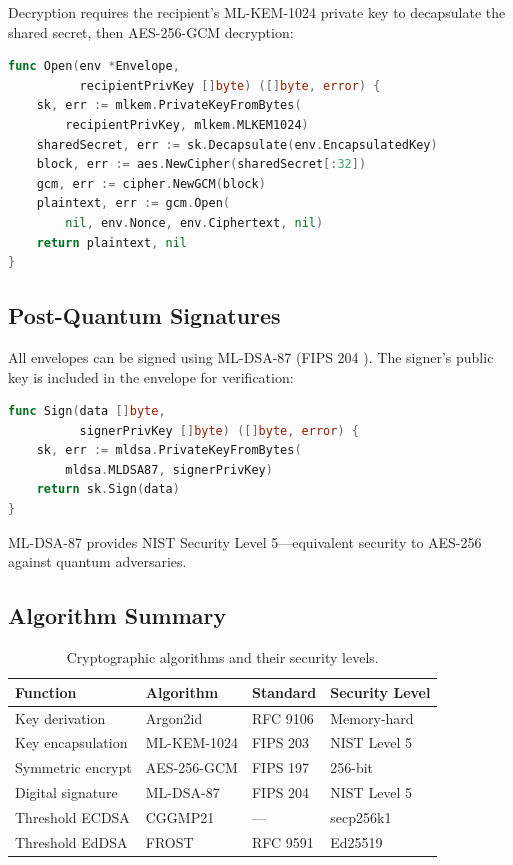 \documentclass[11pt,a4paper]{article}
\begin{document}
Decryption requires the recipient's ML-KEM-1024 private key to
decapsulate the shared secret, then AES-256-GCM decryption:

\begin{lstlisting}[language=Go,caption={envelope.go: decryption path}]
func Open(env *Envelope,
          recipientPrivKey []byte) ([]byte, error) {
    sk, err := mlkem.PrivateKeyFromBytes(
        recipientPrivKey, mlkem.MLKEM1024)
    sharedSecret, err := sk.Decapsulate(env.EncapsulatedKey)
    block, err := aes.NewCipher(sharedSecret[:32])
    gcm, err := cipher.NewGCM(block)
    plaintext, err := gcm.Open(
        nil, env.Nonce, env.Ciphertext, nil)
    return plaintext, nil
}
\end{lstlisting}

\subsection{Post-Quantum Signatures}

All envelopes can be signed using ML-DSA-87 (FIPS 204 \cite{fips204}).
The signer's public key is included in the envelope for verification:

\begin{lstlisting}[language=Go,caption={envelope.go: ML-DSA-87 signing}]
func Sign(data []byte,
          signerPrivKey []byte) ([]byte, error) {
    sk, err := mldsa.PrivateKeyFromBytes(
        mldsa.MLDSA87, signerPrivKey)
    return sk.Sign(data)
}
\end{lstlisting}

ML-DSA-87 provides NIST Security Level 5---equivalent security to
AES-256 against quantum adversaries.

\subsection{Algorithm Summary}

\begin{table}[h]
\centering
\small
\begin{tabular}{@{}llll@{}}
\toprule
\textbf{Function} & \textbf{Algorithm} & \textbf{Standard} & \textbf{Security Level} \\
\midrule
Key derivation    & Argon2id       & RFC 9106       & Memory-hard \\
Key encapsulation & ML-KEM-1024    & FIPS 203       & NIST Level 5 \\
Symmetric encrypt & AES-256-GCM    & FIPS 197       & 256-bit \\
Digital signature  & ML-DSA-87      & FIPS 204       & NIST Level 5 \\
Threshold ECDSA   & CGGMP21        & ---            & secp256k1 \\
Threshold EdDSA   & FROST          & RFC 9591       & Ed25519 \\
\bottomrule
\end{tabular}
\caption{Cryptographic algorithms and their security levels.}
\label{tab:algorithms}
\end{table}
\end{document}
